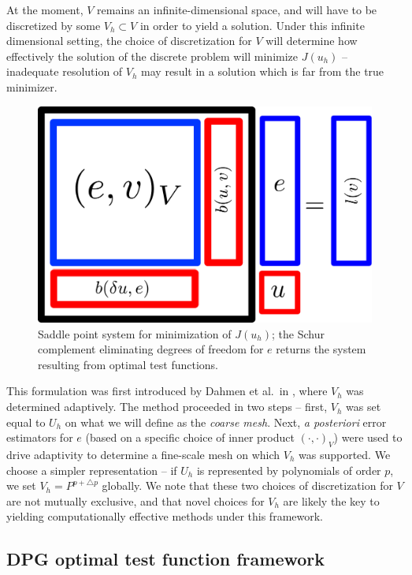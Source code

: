 \documentclass[final,leqno]{siamltex}
\newcommand{\LRp}[1]{\left( #1 \right)}
\begin{document}
At the moment, $V$ remains an infinite-dimensional space, and will have to be discretized by some $V_h\subset V$ in order to yield a solution.  Under this infinite dimensional setting, the choice of discretization for $V$ will determine how effectively the solution of the discrete problem will minimize $J(u_h)$ -- inadequate resolution of $V_h$ may result in a solution which is far from the true minimizer.  

\begin{figure}[!h]
\centering
\includegraphics[scale=.3]{figs/saddlePoint.pdf}
\caption{Saddle point system for minimization of $J(u_h)$; the Schur complement eliminating degrees of freedom for $e$ returns the system resulting from optimal test functions.}
\end{figure}

This formulation was first introduced by Dahmen et al.\ in \cite{DahmenVariationalStabilization}, where $V_h$ was determined adaptively.  The method proceeded in two steps -- first, $V_h$ was set equal to $U_h$ on what we will define as the \textit{coarse mesh}.  Next, \textit{a posteriori} error estimators for $e$ (based on a specific choice of inner product $\LRp{\cdot,\cdot}_V$) were used to drive adaptivity to determine a fine-scale mesh on which $V_h$ was supported.  We choose a simpler representation -- if $U_h$ is represented by polynomials of order $p$, we set $V_h = P^{p+\triangle p}$ globally.  We note that these two choices of discretization for $V$ are not mutually exclusive, and that novel choices for $V_h$ are likely the key to yielding computationally effective methods under this framework.  
\subsection{DPG optimal test function framework}
\end{document}
